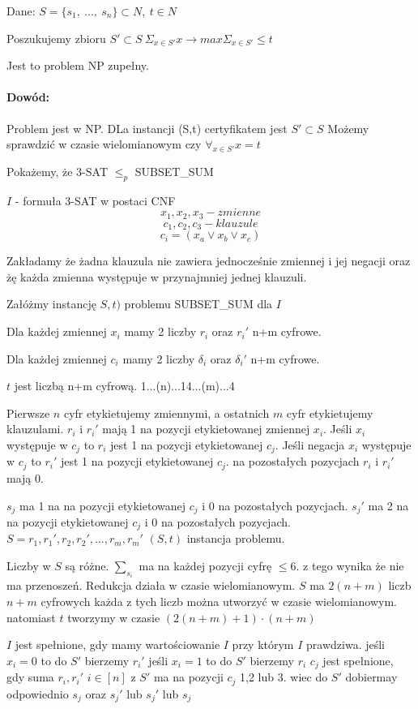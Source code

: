 Dane: $S=\lbrace s_1,\ ...,\ s_n \rbrace \subset N,\ t\in N$

Poszukujemy zbioru $S'\subset S\ \Sigma_{x\in S'}x \rightarrow max\Sigma_{x\in S'}\leq t$

Jest to problem NP zupełny.

\paragraph{Dowód:}{Problem jest w NP. DLa instancji (S,t) certyfikatem jest $S' \subset S$ Możemy sprawdzić w czasie wielomianowym czy $\forall_{x \in S'} x = t$}

Pokażemy, że 3-SAT $\leq_p$ SUBSET\_SUM 

$I$ - formuła 3-SAT w postaci CNF
$$ x_1, x_2, x_3 - zmienne$$
$$ c_1, c_2, c_3 - klauzule$$
$$ c_i = (x_a \lor x_b \lor x_c)$$

Zakładamy że żadna klauzula nie zawiera jednocześnie zmiennej i jej negacji oraz żę każda zmienna występuje w przynajmniej jednej klauzuli.

Załóżmy instancję $S,t)$ problemu SUBSET\_SUM dla $I$

Dla każdej zmiennej $x_i$ mamy 2 liczby $r_i$ oraz $r_i'$ n+m cyfrowe.

Dla każdej zmiennej $c_i$ mamy 2 liczby $\delta_i$ oraz $\delta_i'$ n+m cyfrowe.

$t$ jest liczbą n+m cyfrową. 1...(n)...14...(m)...4

Pierwsze $n$ cyfr etykietujemy zmiennymi, a ostatnich $m$ cyfr etykietujemy klauzulami.
$r_i$ i $r_i'$ mają 1 na pozycji etykietowanej zmiennej $x_i$.
Jeśli $x_i$ występuje w $c_j$ to $r_i$ jest 1 na pozycji etykietowanej $c_j$.
Jeśli negacja $x_i$ występuje w $c_j$ to $r_i'$ jest 1 na pozycji etykietowanej $c_j$. na pozostałych pozycjach $r_i$ i $r_i'$ mają 0.

$s_j$ ma 1 na na pozycji etykietowanej $c_j$ i 0 na pozostałych pozycjach.
$s_j'$ ma 2 na na pozycji etykietowanej $c_j$ i 0 na pozostałych pozycjach.
$S = {r_1, r_1', r_2, r_2', ..., r_m,r_m'}$
$(S,t)$ instancja problemu.

Liczby w $S$ są różne. $\sum_{s_i}$ ma na każdej pozycji cyfrę $\leq 6$.
z tego wynika że nie ma przenoszeń.
Redukcja działa w czasie wielomianowym.
$S$ ma $2(n+m)$ liczb $n+m$ cyfrowych każda z tych liczb można utworzyć w czasie wielomianowym. natomiast $t$ tworzymy w czasie $(2(n+m)+1)\cdot(n+m)$

$I$ jest spełnione, gdy mamy wartościowanie $I$ przy którym $I$ prawdziwa.
jeśli $x_i=0$ to do $S'$ bierzemy $r_i'$
jeśli $x_i=1$ to do $S'$ bierzemy $r_i$
$c_j$ jest spełnione, gdy suma $r_i, r_i'$  $i \in [n]$ z $S'$ ma na pozycji $c_j$  1,2 lub 3. wiec do $S'$ dobiermay odpowiednio $s_j$ oraz $s_j'$ lub $s_j'$ lub $s_j$
 

